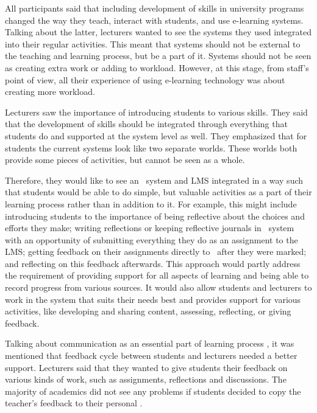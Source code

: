 All participants said that including development of \LLLs skills in university
programs changed the way they teach, interact with students, and use e-learning
systems. Talking about the latter, lecturers wanted to see the systems they used
integrated into their regular activities. This meant that systems should not be
external to the teaching and learning process, but be a part of it. Systems
should not be seen as creating extra work or adding to workload. However, at
this stage, from staff's point of view, all their experience of using e-learning
technology was about creating more workload.


Lecturers saw the importance of introducing students to various \LLLs skills.
They said that the development of \LLLs skills should be integrated through
everything that students do and supported at the system level as well. They
emphasized that for students the current systems look like two separate worlds.
These worlds both provide some pieces of activities, but cannot be seen as a
whole.


Therefore, they would like to see an \ep~system and LMS integrated in a way
such that students would be able to do simple, but valuable activities as a part
of their learning process rather than in addition to it. For example, this might
include introducing students to the importance of being reflective about the
choices and efforts they make; writing reflections or keeping reflective
journals in \ep~system with an opportunity of submitting everything they do as
an assignment to the LMS; getting feedback on their assignments directly to
\ep~after they were marked; and reflecting on this feedback afterwards. This
approach would partly address the requirement of providing support for all
aspects of learning and being able to record progress from various sources. It
would also allow students and lecturers to work in the system that suits their
needs best and provides support for various activities, like developing and
sharing content, assessing, reflecting, or giving feedback.

Talking about communication as an essential part of learning process
\citep{Schaffert2008}, it was mentioned that feedback cycle between students
and lecturers needed a better support. Lecturers said that they wanted to give
students their feedback on various kinds of work, such as assignments,
reflections and discussions. The majority of academics did not see any problems
if students decided to copy the teacher's feedback to their personal \ep.

